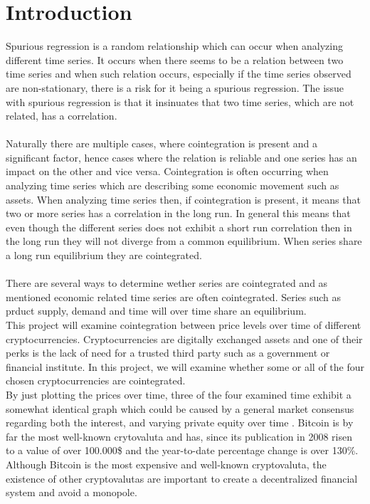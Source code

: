 \chapter{Introduction}
Spurious regression is a random relationship which can occur when analyzing different time series. It occurs when there seems to be a relation between two time series and when such relation occurs, especially if the time series observed are non-stationary, there is a risk for it being a spurious regression. The issue with spurious regression is that it insinuates that two time series, which are not related, has a correlation.\\\\
\noindent Naturally there are multiple cases, where cointegration is present and a significant factor, hence cases where the relation is reliable and one series has an impact on the other and vice versa. Cointegration is often occurring when analyzing time series which are describing some economic movement such as assets. When analyzing time series then, if cointegration is present, it means that two or more series has a correlation in the long run. In general this means that even though the different series does not exhibit a short run correlation then in the long run they will not diverge from a common equilibrium. When series share a long run equilibrium they are cointegrated\cite{Intro_cointegration}.\cite{Intro_cointegration}\\\\
There are several ways to determine wether series are cointegrated and as mentioned economic related time series are often cointegrated. Series such as prduct supply, demand and time will over time share an equilibrium.\\
This project will examine cointegration between price levels over time of different cryptocurrencies. Cryptocurrencies are digitally exchanged assets and one of their perks is the lack of need for a trusted third party such as a government or financial institute. In this project, we will examine whether some or all of the four chosen cryptocurrencies are cointegrated.\\
By just plotting the prices over time, three of the four examined time exhibit a somewhat identical graph which could be caused by a general market consensus regarding both the interest, and varying private equity over time \cite{Coinmarket}. Bitcoin is by far the most well-known crytovaluta and has, since its publication in 2008 risen to a value of over 100.000\$ and the year-to-date percentage change is over 130\%. Although Bitcoin is the most expensive and well-known cryptovaluta, the existence of other cryptovalutas are important to create a decentralized financial system and avoid a monopole.\\
